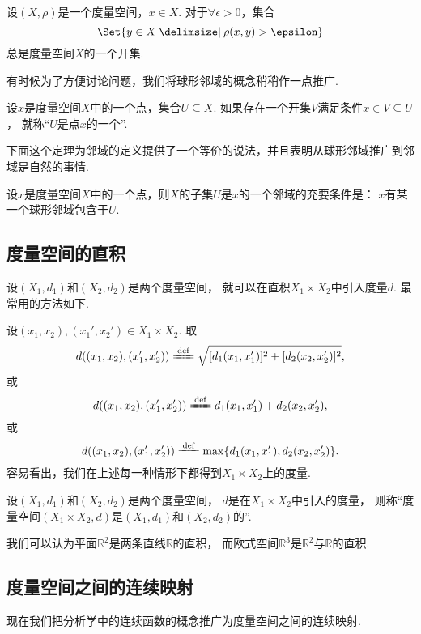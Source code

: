 \begin{proposition}
设\((X,\rho)\)是一个度量空间，\(x \in X\).
对于\(\forall\epsilon>0\)，集合\[
	\Set{ y \in X \given \rho(x,y) > \epsilon }
\]总是度量空间\(X\)的一个开集.
\end{proposition}

有时候为了方便讨论问题，我们将球形邻域的概念稍稍作一点推广.
\begin{definition}\label{definition:度量空间.邻域的概念}
设\(x\)是度量空间\(X\)中的一个点，集合\(U \subseteq X\).
如果存在一个开集\(V\)满足条件\(x \in V \subseteq U\)，
就称“\(U\)是点\(x\)的一个”.
\end{definition}
下面这个定理为邻域的定义提供了一个等价的说法，并且表明从球形邻域推广到邻域是自然的事情.
\begin{theorem}
设\(x\)是度量空间\(X\)中的一个点，则\(X\)的子集\(U\)是\(x\)的一个邻域的充要条件是：
\(x\)有某一个球形邻域包含于\(U\).
\end{theorem}

\subsection{度量空间的直积}
\begingroup
\def\A{X_1}\def\B{X_2}
\def\dA{d_1}\def\dB{d_2}
\def\X{(x_1,x_2)}
\def\Y{(x_1',x_2')}
\def\dAA{d_1(x_1,x_1')}
\def\dBB{d_2(x_2,x_2')}
设\((X_1,d_1)\)和\((X_2,d_2)\)是两个度量空间，
就可以在直积\(X_1 \times X_2\)中引入度量\(d\).
最常用的方法如下.

设\(\X,\Y\in X_1 \times X_2\).
取\[
	d(\X,\Y)
	\defeq
	\sqrt{[\dAA]^2+[\dBB]^2},
\]
或\[
	d(\X,\Y)
	\defeq
	\dAA+\dBB,
\]
或\[
	d(\X,\Y)
	\defeq
	\max\{\dAA,\dBB\}.
\]
容易看出，我们在上述每一种情形下都得到\(X_1 \times X_2\)上的度量.

\begin{definition}
设\((X_1,d_1)\)和\((X_2,d_2)\)是两个度量空间，
\(d\)是在\(X_1 \times X_2\)中引入的度量，
则称“度量空间\((X_1 \times X_2,d)\)是\((X_1,d_1)\)和\((X_2,d_2)\)的”.
\end{definition}

\begin{example}
我们可以认为平面\(\mathbb{R}^2\)是两条直线\(\mathbb{R}\)的直积，
而欧式空间\(\mathbb{R}^3\)是\(\mathbb{R}^2\)与\(\mathbb{R}\)的直积.
\end{example}
\endgroup

\subsection{度量空间之间的连续映射}
现在我们把分析学中的连续函数的概念推广为度量空间之间的连续映射.

